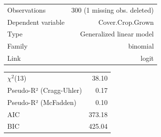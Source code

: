 \documentclass[12pt,]{article}
\begin{document}
\begin{table}[!h]
\centering
\begin{tabular}{lr}
\toprule
\rowcolor{gray!6}  Observations & 300 (1 missing obs. deleted)\\
Dependent variable & Cover.Crop.Grown\\
\rowcolor{gray!6}  Type & Generalized linear model\\
Family & binomial\\
\rowcolor{gray!6}  Link & logit\\
\bottomrule
\end{tabular}
\end{table}

\begin{table}[!h]
\centering
\begin{tabular}{lr}
\toprule
\rowcolor{gray!6}  $\chi^2$(13) & 38.10\\
Pseudo-R² (Cragg-Uhler) & 0.17\\
\rowcolor{gray!6}  Pseudo-R² (McFadden) & 0.10\\
AIC & 373.18\\
\rowcolor{gray!6}  BIC & 425.04\\
\bottomrule
\end{tabular}
\end{table}
\end{document}
